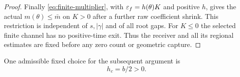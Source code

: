 \begin{proof}
Finally \eqref{eq:finite-multiplier}, with
\(\varepsilon_f=h(\theta)K\) and positive \(h\), gives the actual
\(m(\theta)\le\bar m\) on \(K>0\) after a further raw coefficient
shrink. This restriction is independent of \(s,|\gamma|\) and of
all root gaps. For \(K\le0\) the selected finite channel has no
positive-time exit. Thus the receiver and all its regional estimates
are fixed before any zero count or geometric capture.
\end{proof}

One admissible fixed choice for the subsequent argument is
\begin{equation}\label{eq:common-raw-cap}
h_c=b/2>0.
\end{equation}
